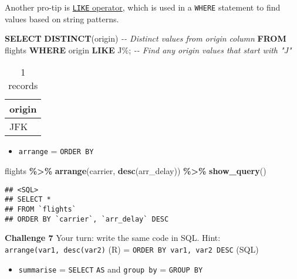 \documentclass[
]{book}
\newenvironment{Shaded}{\begin{snugshade}}{\end{snugshade}}
\newcommand{\CommentTok}[1]{\textcolor[rgb]{0.56,0.35,0.01}{\textit{#1}}}
\newcommand{\KeywordTok}[1]{\textcolor[rgb]{0.13,0.29,0.53}{\textbf{#1}}}
\newcommand{\NormalTok}[1]{#1}
\newcommand{\OperatorTok}[1]{\textcolor[rgb]{0.81,0.36,0.00}{\textbf{#1}}}
\newcommand{\StringTok}[1]{\textcolor[rgb]{0.31,0.60,0.02}{#1}}
\providecommand{\tightlist}{%
  \setlength{\itemsep}{0pt}\setlength{\parskip}{0pt}}
\begin{document}
Another pro-tip is \href{https://www.w3schools.com/sql/sql_like.asp}{\texttt{LIKE} operator}, which is used in a \texttt{WHERE} statement to find values based on string patterns.

\begin{Shaded}
\begin{Highlighting}[]
\KeywordTok{SELECT} \KeywordTok{DISTINCT}\NormalTok{(origin) }\CommentTok{{-}{-} Distinct values from origin column}
\KeywordTok{FROM}\NormalTok{ flights}
\KeywordTok{WHERE}\NormalTok{ origin }\KeywordTok{LIKE} \StringTok{\textquotesingle{}J\%\textquotesingle{}}\NormalTok{; }\CommentTok{{-}{-} Find any origin values that start with "J"}
\end{Highlighting}
\end{Shaded}

\begin{table}

\caption{\label{tab:unnamed-chunk-15}1 records}
\centering
\begin{tabular}[t]{l}
\hline
origin\\
\hline
JFK\\
\hline
\end{tabular}
\end{table}

\begin{itemize}
\tightlist
\item
  \texttt{arrange} = \texttt{ORDER\ BY}
\end{itemize}

\begin{Shaded}
\begin{Highlighting}[]
\NormalTok{flights }\OperatorTok{\%\textgreater{}\%}\StringTok{ }
\StringTok{  }\KeywordTok{arrange}\NormalTok{(carrier, }\KeywordTok{desc}\NormalTok{(arr\_delay)) }\OperatorTok{\%\textgreater{}\%}
\StringTok{  }\KeywordTok{show\_query}\NormalTok{()}
\end{Highlighting}
\end{Shaded}

\begin{verbatim}
## <SQL>
## SELECT *
## FROM `flights`
## ORDER BY `carrier`, `arr_delay` DESC
\end{verbatim}

\textbf{Challenge 7}
Your turn: write the same code in SQL.
Hint: \texttt{arrange(var1,\ desc(var2)} (R) = \texttt{ORDER\ BY\ var1,\ var2\ DESC} (SQL)

\begin{itemize}
\tightlist
\item
  \texttt{summarise} = \texttt{SELECT} \texttt{AS} and \texttt{group\ by} = \texttt{GROUP\ BY}
\end{itemize}
\end{document}
